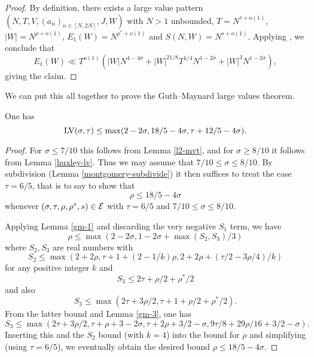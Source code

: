 \literature
{}

\begin{proof} By definition, there exists a large value pattern $(N,T,V,(a_n)_{n \in [N,2N]},J,W)$ with $N>1$ unbounded, $T = N^{\tau+o(1)}$, $|W| = N^{\rho+o(1)}$, $E_1(W) = N^{\rho^*+o(1)}$ and $S(N,W) = N^{s+o(1)}$.  Applying \cite[Proposition 11.1]{guth-maynard}, we conclude that
    $$ E_1(W) \ll T^{o(1)} ( |W| N^{4-4\sigma} + |W|^{21/8} T^{1/4} N^{1-2\sigma} + |W|^3 N^{1-2\sigma} ),$$
giving the claim.
\end{proof}

We can put this all together to prove the Guth--Maynard large values theorem.

\begin{theorem}\label{guth-maynard-lvt}\cite[Theorem~1.1]{guth-maynard} One has
    $$ \mathrm{LV}(\sigma,\tau) \leq \max(2-2\sigma, 18/5 - 4 \sigma, \tau + 12/5 - 4\sigma).$$
\end{theorem}

\literature
{}

\begin{proof} For $\sigma \leq 7/10$ this follows from Lemma \ref{l2-mvt}, and for $\sigma \geq 8/10$ it follows from Lemma \ref{huxley-lv}.  Thus we may assume that $7/10 \leq \sigma \leq 8/10$.  By subdivision (Lemma \ref{montgomery-subdivide}) it then suffices to treat the case $\tau = 6/5$, that is to say to show that
    $$ \rho \leq 18/5-4\sigma$$
whenever $(\sigma,\tau,\rho,\rho^*,s) \in \mathcal{E}$ with $\tau=6/5$ and $7/10 \leq \sigma \leq 8/10$.

Applying Lemma \ref{gm-1} and discarding the very negative $S_1$ term, we have
$$ \rho \leq \max(2-2\sigma, 1-2\sigma + \max(S_2, S_3)/3)$$
where $S_2, S_3$ are real numbers with
$$ S_2 \leq \max(2+2\rho, \tau+1+(2-1/k) \rho, 2 + 2\rho + (\tau/2 - 3\rho/4)/k )$$
for any positive integer $k$ and
$$ S_3 \leq 2\tau + \rho/2 + \rho^*/2$$
and also
$$ S_3 \leq \max( 2\tau + 3\rho/2, \tau+1+\rho/2+\rho^*/2).$$
From the latter bound and Lemma \ref{gm-3}, one has
$$ S_3 \leq \max( 2\tau+3\rho/2, \tau+\rho+3-2\sigma, \tau+2\rho+3/2-\sigma, 9\tau/8+29\rho/16 + 3/2-\sigma).$$
Inserting this and the $S_2$ bound (with $k=4$) into the bound for $\rho$ and simplifying (using $\tau=6/5$), we eventually obtain
the desired bound $\rho \leq 18/5-4\sigma$.
\end{proof}


